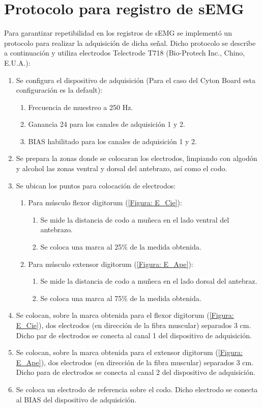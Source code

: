 \newpage
\section{Protocolo para registro de sEMG}\label{Sec: ProReg}
Para garantizar repetibilidad en los registros de sEMG se implementó un protocolo para realizar la adquisición de dicha señal. Dicho protocolo se describe a continuación y utiliza electrodos Telectrode T718 (Bio-Protech Inc., Chino, E.U.A.):

\begin{enumerate}
	\item Se configura el dispositivo de adquisición (Para el caso del Cyton Board esta configuración es la default):
	\begin{enumerate}
		\item Frecuencia de muestreo a 250 Hz.
		\item Ganancia 24 para los canales de adquisición 1 y 2.
		\item BIAS habilitado para los canales de adquisición 1 y 2.
	\end{enumerate}
	\item Se prepara la zonas donde se colocaran los electrodos, limpiando con algodón y alcohol las zonas ventral y dorsal del antebrazo, así como el codo.
	\item Se ubican los puntos para colocación de electrodos:
	\begin{enumerate}
		\item Para músculo flexor digitorum (\ref{Figura: E_Cie}):
		\begin{enumerate}
			\item Se mide la distancia de codo a muñeca en el lado ventral del antebrazo.
			\item Se coloca una marca al 25\% de la medida obtenida.
		\end{enumerate}
		\item Para músculo extensor digitorum (\ref{Figura: E_Ape}):
		\begin{enumerate}
			\item Se mide la distancia de codo a muñeca en el lado dorsal del antebraz.
			\item Se coloca una marca al 75\% de la medida obtenida.
		\end{enumerate}
	\end{enumerate}
	\item Se colocan, sobre la marca obtenida para el flexor digitorum (\ref{Figura: E_Cie}), dos electrodos (en dirección de la fibra muscular) separados 3 cm. Dicho par de electrodos se conecta al canal 1 del dispositivo de adquisición.
	\item Se colocan, sobre la marca obtenida para el extensor digitorum (\ref{Figura: E_Ape}), dos electrodos (en dirección de la fibra muscular) separados 3 cm. Dicho para de electrodos se conecta al canal 2 del dispositivo de adquisición.
	\item Se coloca un electrodo de referencia sobre el codo. Dicho electrodo se conecta al BIAS del dispositivo de adquisición.
\end{enumerate}

